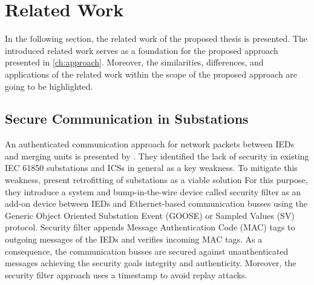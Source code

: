 \chapter{Related Work}
\label{ch:relatedwork}
In the following section, the related work of the proposed thesis is presented.
The introduced related work serves as a foundation for the proposed approach presented in \autoref{ch:approach}.
Moreover, the similarities, differences, and applications of the related work within the scope of the proposed approach are going to be highlighted.

\section{Secure Communication in Substations}
An authenticated communication approach for network packets between IEDs and merging units is presented by \citeauthor{Ishchenko2018} \cite{Ishchenko2018}.
They identified the lack of security in existing IEC 61850 substations and ICSs in general as a key weakness.
To mitigate this weakness, \citeauthor{Ishchenko2018} present retrofitting of substations as a viable solution
For this purpose, they introduce a system and bump-in-the-wire device called security filter as an add-on device between IEDs and Ethernet-based communication busses using the Generic Object Oriented Substation Event (GOOSE) or Sampled Values (SV) protocol.
Security filter appends Message Authentication Code (MAC) tags to outgoing messages of the IEDs and verifies incoming MAC tags.
As a consequence, the communication busses are secured against unauthenticated messages achieving the security goals integrity and authenticity.
Moreover, the security filter approach uses a timestamp to avoid replay attacks.

